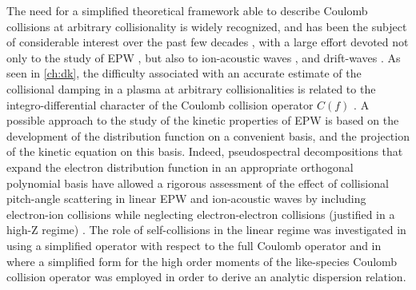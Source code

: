 The need for a simplified theoretical framework able to describe Coulomb collisions at arbitrary collisionality is widely recognized, and has been the subject of considerable interest over the past few decades \citep{Callen1997, Ji2010}, with a large effort devoted not only to the study of EPW \citep{Hammett1990,Brantov2012,Banks2016}, but also to ion-acoustic waves \citep{Epperlein1992,Tracy1993a,Zheng2000}, and drift-waves \citep{Jorge2018}.
%
As seen in \cref{ch:dk}, the difficulty associated with an accurate estimate of the collisional damping in a plasma at arbitrary collisionalities is related to the integro-differential character of the Coulomb collision operator $C(f)$ \citep{Helander2002}.
%
{A possible approach to the study of the kinetic properties of EPW is based on the development of the distribution function on a {convenient} basis, and the projection of the kinetic equation on this basis.
%
Indeed,}
pseudospectral decompositions that expand the electron distribution function in an appropriate orthogonal polynomial basis {have allowed a rigorous assessment of} the effect of {collisional} pitch-angle scattering in {linear} EPW and {ion-acoustic waves} by including electron-ion collisions while neglecting electron-electron collisions (justified in a high-Z regime) \citep{Epperlein1992,Banks2016}.
%
The role of self-collisions {in the linear regime} was investigated in \citet{Banks2017} using a simplified operator with respect to the full Coulomb operator and in \citet{Brantov2012} where a simplified form for the high order moments of the like-species Coulomb collision operator was employed in order to derive an analytic dispersion relation.
%

